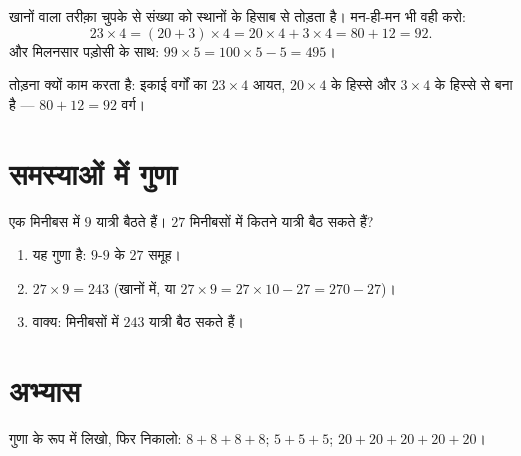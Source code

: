 \begin{example}[मन-ही-मन गुणा के लिए तोड़ना]\label{ex:g3:mult:split}
खानों वाला तरीक़ा चुपके से संख्या को स्थानों के हिसाब से तोड़ता
है। मन-ही-मन भी वही करो:
\[
23 \times 4 = (20 + 3) \times 4 = 20 \times 4 + 3 \times 4
= 80 + 12 = 92 .
\]
और मिलनसार पड़ोसी के साथ: $99 \times 5 = 100 \times 5 - 5 =
495$।
\end{example}

\begin{omfigure}

{\small तोड़ना क्यों काम करता है: इकाई वर्गों का $23 \times 4$
आयत, $20 \times 4$ के हिस्से और $3 \times 4$ के हिस्से से बना
है --- $80 + 12 = 92$ वर्ग।}
\end{omfigure}

\section{समस्याओं में गुणा}

\begin{example}\label{ex:g3:mult:problem}
एक मिनीबस में $9$ यात्री बैठते हैं। $27$ मिनीबसों में कितने
यात्री बैठ सकते हैं?
\begin{enumerate}
  \item यह गुणा है: $9$-$9$ के $27$ समूह।
  \item $27 \times 9 = 243$ (खानों में, या
        $27 \times 9 = 27 \times 10 - 27 = 270 - 27$)।
  \item वाक्य: मिनीबसों में $243$ यात्री बैठ सकते हैं।
\end{enumerate}
\end{example}

\section{अभ्यास}

\begin{exercise}[$\star$]\label{exo:g3:mult:1}
गुणा के रूप में लिखो, फिर निकालो:
$8 + 8 + 8 + 8$; \quad $5 + 5 + 5$; \quad
$20 + 20 + 20 + 20 + 20$।
\end{exercise}

